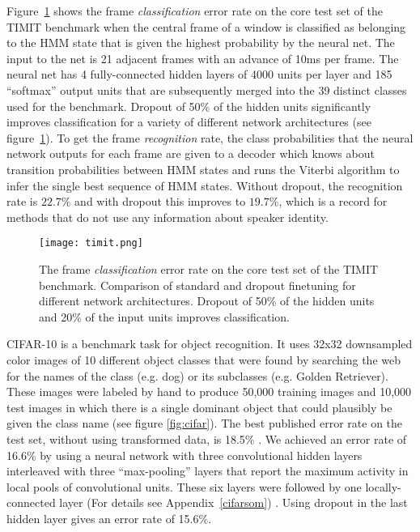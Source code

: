 \documentclass[12pt]{article}
\begin{document}
Figure~\ref{fig:timitplot} shows the frame {\it classification} error rate on the core test set of the
TIMIT benchmark when the central frame of a window is classified as belonging to the HMM
state that is given the highest probability by the neural net.  The input to the net is
21 adjacent frames with an advance of 10ms per frame. The neural net has 4 fully-connected
hidden layers of 4000 units per layer and 185 ``softmax'' output units that are subsequently
merged into the 39 distinct classes used for the benchmark. Dropout of 50\% of the hidden
units significantly improves classification for a variety of different network
architectures (see figure~\ref{fig:timitplot}).  To get the frame {\it recognition} rate, the class
probabilities that the neural network outputs for each frame are given to a decoder which
knows about transition probabilities between HMM states and runs the Viterbi algorithm to
infer the single best sequence of HMM states. Without dropout, the recognition rate is
$22.7$\% and with dropout this improves to $19.7$\%, which is a record for methods that do not use
any information about speaker identity.

\begin{figure}[t!]
\centerline{\texttt{[image: timit.png]}}
\caption{The frame {\it classification} error rate on the core test set of the TIMIT
  benchmark. Comparison of standard and dropout finetuning for different network
  architectures. Dropout of 50\% of the hidden 
  units and 20\% of the input units improves classification.}
\label{fig:timitplot}
\end{figure}

CIFAR-10 is a benchmark task for object recognition. It uses 32x32 downsampled color
images of 10 different object classes that were found by searching the web for the names
of the class (e.g. dog) or its subclasses (e.g. Golden Retriever). These images were
labeled by hand to produce 50,000 training images and 10,000 test images in which there is
a single dominant object that could plausibly be given the class name \cite{kriz} (see
figure \ref{fig:cifar}). The best published error rate on the test set, without using
transformed data, is 18.5\% \cite{Coates2011}. We achieved an error rate of 16.6\% by using a
neural network with three convolutional hidden layers interleaved with three
``max-pooling'' layers that report the maximum activity in local pools of convolutional
units. These six layers were followed by one locally-connected layer (For details see Appendix~\ref{cifarsom}) . Using
dropout in the last hidden layer gives an error rate of 15.6\%.
\end{document}
